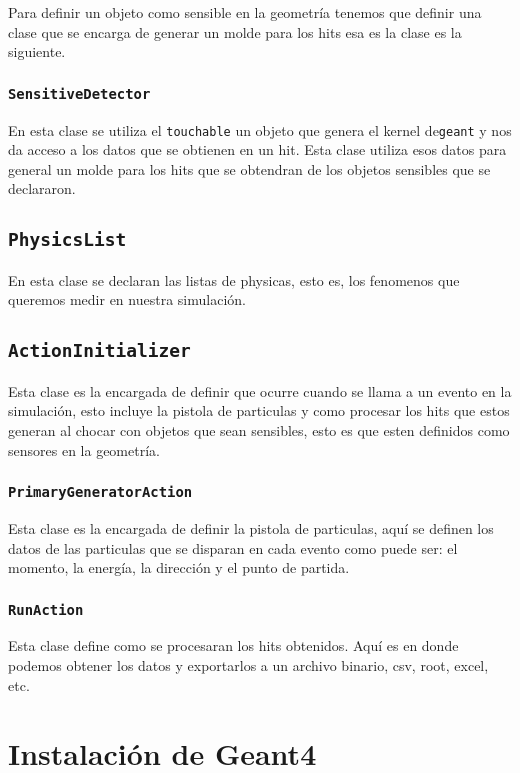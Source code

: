 \documentclass[a4paper,10pt]{article}
\begin{document}
		Para definir un objeto como sensible en la geometría tenemos que definir una clase que se encarga de generar un molde para los hits esa es la clase es la siguiente.

		\subsubsection{\verb|SensitiveDetector|}

			En esta clase se utiliza el \verb|touchable| un objeto que genera el kernel de\verb|geant| y nos da acceso a los datos que se obtienen en un hit. Esta clase utiliza esos datos para general un molde para los hits que se obtendran de los objetos sensibles que se declararon.

	\subsection{\verb|PhysicsList|}

		En esta clase se declaran las listas de physicas, esto es, los fenomenos que queremos medir en nuestra simulación.

	\subsection{\verb|ActionInitializer|}
		
		Esta clase es la encargada de definir que ocurre cuando se llama a un evento en la simulación, esto incluye la pistola de particulas y como procesar los hits que estos generan al chocar con objetos que sean sensibles, esto es que esten definidos como sensores en la geometría.

		\subsubsection{\verb|PrimaryGeneratorAction|}
			
			Esta clase es la encargada de definir la pistola de particulas, aquí se definen los datos de las particulas que se disparan en cada evento como puede ser: el momento, la energía, la dirección y el punto de partida.

		\subsubsection{\verb|RunAction|}

			Esta clase define como se procesaran los hits obtenidos. Aquí es en donde podemos obtener los datos y exportarlos a un archivo binario, csv, root, excel, etc.

    \appendix
        \section{Instalación de Geant4}
\end{document}
